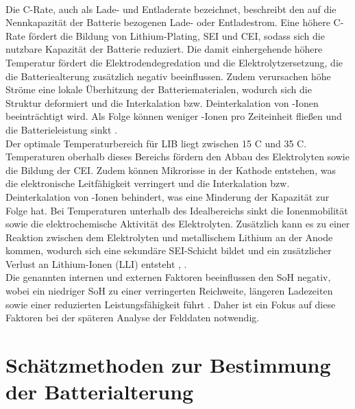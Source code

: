 \\
Die C-Rate, auch als Lade- und Entladerate bezeichnet, beschreibt den auf die Nennkapazität der Batterie bezogenen Lade- oder Entladestrom. Eine höhere C-Rate fördert die Bildung von Lithium-Plating, \acs{SEI} und \acs{CEI}, sodass sich die nutzbare Kapazität der Batterie reduziert. Die damit einhergehende höhere Temperatur fördert die Elektrodendegredation und die Elektrolytzersetzung, die die Batteriealterung zusätzlich negativ beeinflussen. Zudem verursachen höhe Ströme eine lokale Überhitzung der Batteriematerialen, wodurch sich die Struktur deformiert und die Interkalation bzw. Deinterkalation von -Ionen beeinträchtigt wird. Als Folge können weniger -Ionen pro Zeiteinheit fließen und die Batterieleistung sinkt  \cite{urlIdBatterieNiedrigeTemperaturenLithiumBatterien}.
\\
Der optimale Temperaturbereich für \acs{LIB} liegt zwischen 15 \textdegree C und 35 \textdegree C. Temperaturen oberhalb dieses Bereichs fördern den Abbau des Elektrolyten sowie die Bildung der \acs{CEI}. Zudem können Mikrorisse in der Kathode entstehen, was die elektronische Leitfähigkeit verringert und die Interkalation bzw. Deinterkalation von -Ionen behindert, was eine Minderung der Kapazität zur Folge hat. Bei Temperaturen unterhalb des Idealbereichs sinkt die Ionenmobilität sowie die elektrochemische Aktivität des Elektrolyten. Zusätzlich kann es zu einer Reaktion zwischen dem Elektrolyten und metallischem Lithium an der Anode kommen, wodurch sich eine sekundäre \acs{SEI}-Schicht bildet und ein zusätzlicher Verlust an Lithium-Ionen (LLI) entsteht \cite{urlIdBatterieAlterungTemperatur}, \cite{urlIdBatterieAlterungTemperatur2}.
\\
Die genannten internen und externen Faktoren beeinflussen den \acs{SoH} negativ, wobei ein niedriger \acs{SoH} zu einer verringerten Reichweite, längeren Ladezeiten sowie einer reduzierten Leistungsfähigkeit führt \cite{articleAlterungLithiumBatterien}. Daher ist ein Fokus auf diese Faktoren bei der späteren Analyse der Felddaten notwendig.
\pagebreak

\section{Schätzmethoden zur Bestimmung der Batterialterung}

